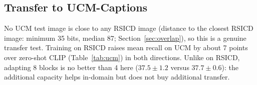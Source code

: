 \documentclass[11pt,a4paper]{article}
\begin{document}
\subsection{Transfer to UCM-Captions}
\begin{table}[t]
\centering\small
\caption{UCM-Captions test split (210 images, 1{,}050 captions), models trained on RSICD only. Recall in \%.}\label{tab:ucm}
\end{table}
No UCM test image is close to any RSICD image (distance to the closest RSICD image: minimum 35 bits, median 87; Section~\ref{sec:overlap}), so this is a genuine transfer test. Training on RSICD raises mean recall on UCM by about 7 points over zero-shot CLIP (Table~\ref{tab:ucm}) in both directions. Unlike on RSICD, adapting 8 blocks is no better than 4 here ($37.5\pm1.2$ versus $37.7\pm0.6$): the additional capacity helps in-domain but does not buy additional transfer.
\end{document}
